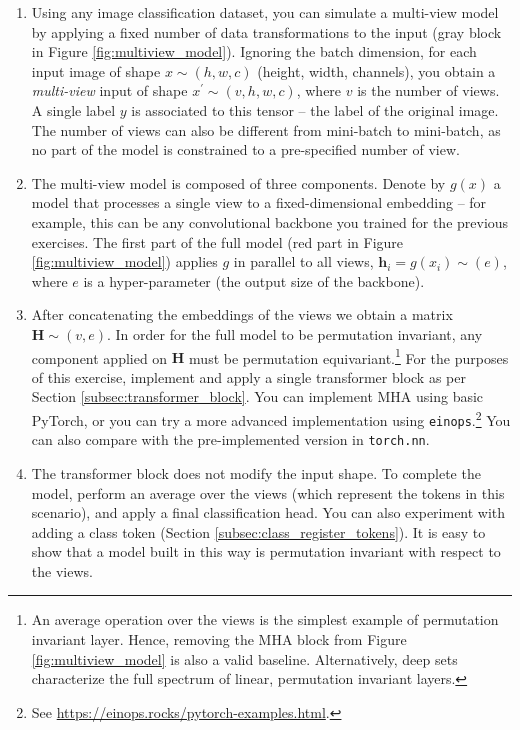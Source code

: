 \begin{enumerate}
\item Using any image classification dataset, you can simulate a multi-view model by applying a fixed number of data transformations to the input (gray block in Figure \ref{fig:multiview_model}). Ignoring the batch dimension, for each input image of shape $x \sim (h,w,c)$ (height, width, channels), you obtain a \textit{multi-view} input of shape $x^\prime \sim (v,h,w,c)$, where $v$ is the number of views. A single label $y$ is associated to this tensor -- the label of the original image. The number of views can also be different from mini-batch to mini-batch, as no part of the model is constrained to a pre-specified number of view.
\item The multi-view model is composed of three components. Denote by $g(x)$ a model that processes a single view to a fixed-dimensional embedding -- for example, this can be any convolutional backbone you trained for the previous exercises. The first part of the full model (red part in Figure \ref{fig:multiview_model}) applies $g$ in parallel to all views, $\mathbf{h}_i = g(x_i) \sim (e)$, where $e$ is a hyper-parameter (the output size of the backbone).
\item After concatenating the embeddings of the views we obtain a matrix $\mathbf{H} \sim (v, e)$. In order for the full model to be permutation invariant, any component applied on $\mathbf{H}$ must be permutation equivariant.\footnote{An average operation over the views is the simplest example of permutation invariant layer. Hence, removing the MHA block from Figure \ref{fig:multiview_model} is also a valid baseline. Alternatively, deep sets \cite{zaheer2017deep} characterize the full spectrum of linear, permutation invariant layers.} For the purposes of this exercise, implement and apply a single transformer block as per Section \ref{subsec:transformer_block}. You can implement MHA using basic PyTorch, or you can try a more advanced implementation using \texttt{einops}.\footnote{See \url{https://einops.rocks/pytorch-examples.html}.} You can also compare with the pre-implemented version in \texttt{torch.nn}.
\item The transformer block does not modify the input shape. To complete the model, perform an average over the views (which represent the tokens in this scenario), and apply a final classification head. You can also experiment with adding a class token (Section \ref{subsec:class_register_tokens}). It is easy to show that a model built in this way is permutation invariant with respect to the views.
\end{enumerate}